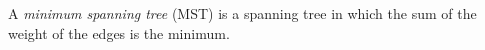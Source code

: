 \documentclass[a4paper,11pt]{book}
\begin{document}
\noindent A \textit{minimum spanning tree} (MST) is a spanning tree in which the sum of the weight of the edges is the minimum.

%
%
% 
% 
% 
% 
% 
% 
% 
% 
% 
% 
% 
% 
% 
\end{document}
